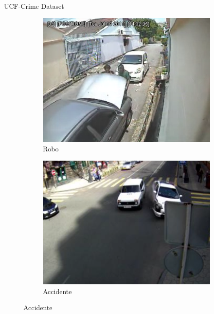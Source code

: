 \documentclass[10pt]{beamer}
\begin{document}
\begin{frame}{UCF-Crime Dataset}
\begin{figure}[hbtp]
\begin{subfigure}{0.35\textwidth}
      \includegraphics[width=\linewidth]{images/ucf/stealing-abnormal}
      \caption{Robo}
    \end{subfigure}
    \begin{subfigure}{0.35\textwidth}
      \centering
      \includegraphics[width=\linewidth]{images/ucf/roadaccident-abnormal}
      \caption{Accidente}
    \end{subfigure}
  \end{figure}
\end{frame}
\end{document}
